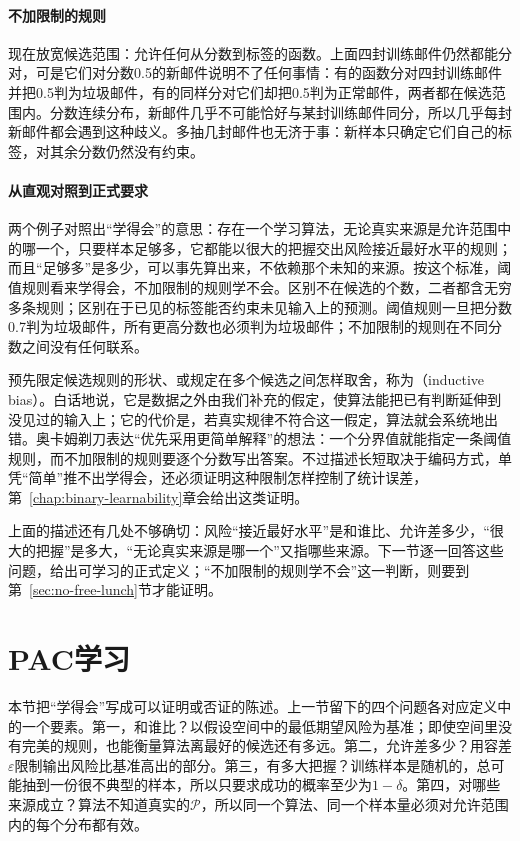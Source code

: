\paragraph{不加限制的规则}
现在放宽候选范围：允许任何从分数到标签的函数。上面四封训练邮件仍然都能分对，可是它们对分数0.5的新邮件说明不了任何事情：有的函数分对四封训练邮件并把0.5判为垃圾邮件，有的同样分对它们却把0.5判为正常邮件，两者都在候选范围内。分数连续分布，新邮件几乎不可能恰好与某封训练邮件同分，所以几乎每封新邮件都会遇到这种歧义。多抽几封邮件也无济于事：新样本只确定它们自己的标签，对其余分数仍然没有约束。

\paragraph{从直观对照到正式要求}
两个例子对照出“学得会”的意思：存在一个学习算法，无论真实来源是允许范围中的哪一个，只要样本足够多，它都能以很大的把握交出风险接近最好水平的规则；而且“足够多”是多少，可以事先算出来，不依赖那个未知的来源。按这个标准，阈值规则看来学得会，不加限制的规则学不会。区别不在候选的个数，二者都含无穷多条规则；区别在于已见的标签能否约束未见输入上的预测。阈值规则一旦把分数0.7判为垃圾邮件，所有更高分数也必须判为垃圾邮件；不加限制的规则在不同分数之间没有任何联系。

预先限定候选规则的形状、或规定在多个候选之间怎样取舍，称为（inductive bias）。白话地说，它是数据之外由我们补充的假定，使算法能把已有判断延伸到没见过的输入上；它的代价是，若真实规律不符合这一假定，算法就会系统地出错。奥卡姆剃刀表达“优先采用更简单解释”的想法：一个分界值就能指定一条阈值规则，而不加限制的规则要逐个分数写出答案。不过描述长短取决于编码方式，单凭“简单”推不出学得会，还必须证明这种限制怎样控制了统计误差，第~\ref{chap:binary-learnability}章会给出这类证明。

上面的描述还有几处不够确切：风险“接近最好水平”是和谁比、允许差多少，“很大的把握”是多大，“无论真实来源是哪一个”又指哪些来源。下一节逐一回答这些问题，给出可学习的正式定义；“不加限制的规则学不会”这一判断，则要到第~\ref{sec:no-free-lunch}节才能证明。

\section{PAC学习}
\label{sec:pac-learning}

本节把“学得会”写成可以证明或否证的陈述。上一节留下的四个问题各对应定义中的一个要素。第一，和谁比？以假设空间中的最低期望风险为基准；即使空间里没有完美的规则，也能衡量算法离最好的候选还有多远。第二，允许差多少？用容差$\varepsilon$限制输出风险比基准高出的部分。第三，有多大把握？训练样本是随机的，总可能抽到一份很不典型的样本，所以只要求成功的概率至少为$1-\delta$。第四，对哪些来源成立？算法不知道真实的$\mathcal P$，所以同一个算法、同一个样本量必须对允许范围内的每个分布都有效。

